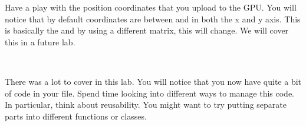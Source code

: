 \documentclass[10pt]{article}
\begin{document}


Have a play with the position coordinates that you upload to the
GPU. You will notice that by default  coordinates
are between  and  in both the x and y axis.
This is basically the  and by using
a different  matrix, this will change. We will cover
this in a future lab.

\

There was a lot to cover in this lab. You will notice that you now have
quite a bit of code in your  file.  Spend time looking into different
ways to manage this code. In particular, think about reusability. You
might want to try putting separate parts into different functions
or classes.

\end{document}
